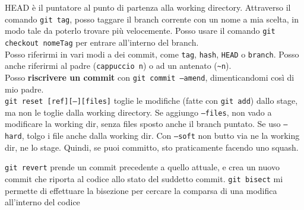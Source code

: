 \documentclass[a4paper,12pt]{article}
\begin{document}
\vspace{1cm}
HEAD è il puntatore al punto di partenza alla working directory. Attraverso il comando \texttt{git tag}, posso taggare il branch corrente con un nome a mia scelta, in modo tale da poterlo trovare più velocemente. Posso usare il comando \texttt{git checkout nomeTag} per entrare all'interno del branch.\\
Posso riferirmi in vari modi a dei commit, come \texttt{tag}, \texttt{hash}, \texttt{HEAD} o \texttt{branch}. Posso anche riferirmi al padre (\texttt{cappuccio n}) o ad un antenato (\texttt{\textasciitilde n}).\\
Posso \textbf{riscrivere un commit} con \texttt{git commit --amend}, dimenticandomi così di mio padre.\\
\texttt{git reset [ref][--][files]} toglie le modifiche (fatte con \texttt{git add}) dallo stage, ma non le toglie dalla working directory. Se aggiungo \texttt{--files}, non vado a modificare la working dir, senza files sposto anche il branch puntato. Se uso \texttt{--hard}, tolgo i file anche dalla working dir. Con \texttt{--soft} non butto via ne la working dir, ne lo stage. Quindi, se puoi committo, sto praticamente facendo uno squash.

\texttt{git revert} prende un commit precedente a quello attuale, e crea un nuovo commit che riporta al codice allo stato del suddetto commit.
\texttt{git bisect} mi permette di effettuare la bisezione per cercare la comparsa di una modifica all'interno del codice
\end{document}
